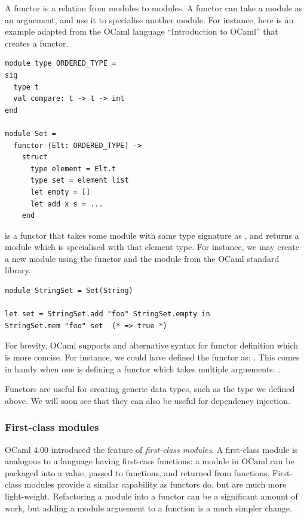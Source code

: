 A functor is a relation from modules to modules. A functor can take a
module as an arguement, and use it to specialise another module. For
instance, here is an example adapted from the OCaml language
``Introduction to OCaml'' \cite{ocaml:spec} that creates a 
functor.

\begin{lstlisting}
module type ORDERED_TYPE =
sig
  type t
  val compare: t -> t -> int
end

module Set =
  functor (Elt: ORDERED_TYPE) ->
    struct
      type element = Elt.t
      type set = element list
      let empty = []
      let add x s = ...
    end
\end{lstlisting}

 is a functor that takes some module with same type
signature as , and returns a module which is
specialised with that element type. For instance, we may create a new
 module using the  functor and the
 module from the OCaml standard library.

\begin{lstlisting}
module StringSet = Set(String)

let set = StringSet.add "foo" StringSet.empty in
StringSet.mem "foo" set  (* => true *)
\end{lstlisting}

For brevity, OCaml supports and alternative syntax for functor
definition which is more concise. For instance, we could have defined
the  functor as:
.
This comes in handy when one is defining a functor which takes
multiple arguements:
 .

Functors are useful for creating generic data types, such as the
 type we defined above. We will soon see that they can also
be useful for dependency injection.

\subsubsection{First-class modules}

OCaml 4.00 introduced the feature of \textit{first-class modules}. A
first-class module is analogous to a language having first-cass
functions: a module in OCaml can be packaged into a value, passed to
functions, and returned from functions. First-class modules provide a
similar capability as functors do, but are much more
light-weight. Refactoring a module into a functor can be a significant
amount of work, but adding a module arguement to a function is a much
simpler change.

